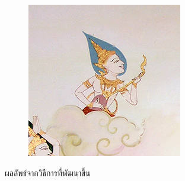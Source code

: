 \documentclass[hidelinks, a4paper,12pt]{article}
\numberwithin{equation}{section}							%
\numberwithin{equation}{section}
\begin{document}
{\begin{figure}[H]
\begin{subfigure}{0.4\linewidth}
			\includegraphics[width=0.8\linewidth]{images/result_ex4/multisplitbergman_case05.png}			
		\end{subfigure}
		\caption{ผลลัพธ์จากวิธีการที่พัฒนาขึ้น}
	\end{figure}

}
\end{document}
